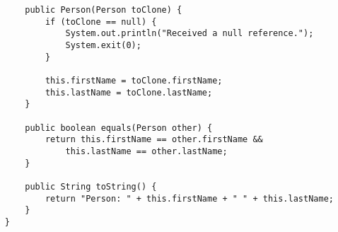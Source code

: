 \documentclass[12pt]{report}
\begin{document}
\begin{flushleft}
\begin{lstlisting}
        public Person(Person toClone) {
            if (toClone == null) {
                System.out.println("Received a null reference.");
                System.exit(0);
            }

            this.firstName = toClone.firstName;
            this.lastName = toClone.lastName;
        }

        public boolean equals(Person other) {
            return this.firstName == other.firstName &&
                this.lastName == other.lastName; 
        }

        public String toString() {
            return "Person: " + this.firstName + " " + this.lastName;
        }
    }
\end{lstlisting}

\end{flushleft}
\end{document}
